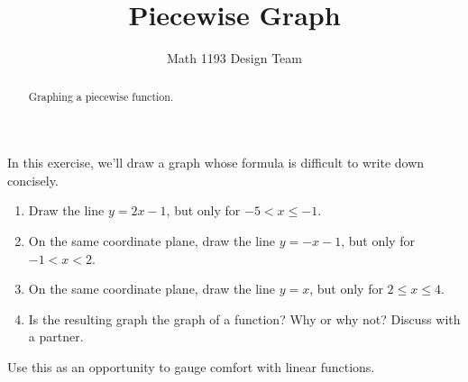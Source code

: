 \documentclass[noauthor]{ximera}
\title{Piecewise Graph}
\author{Math 1193 Design Team}
\begin{document}
\begin{abstract}
    Graphing a piecewise function.
\end{abstract}
\maketitle

In this exercise, we'll draw a graph whose formula is 
difficult to write down concisely.

\begin{enumerate}
    \item Draw the line \(y = 2x - 1\), but only for
    \(-5 < x \le -1\).
    \item On the same coordinate plane, draw the line 
    \(y = -x - 1\), but only for \(-1 < x < 2\).
    \item On the same coordinate plane, draw the line \(y = x\),
    but only for \(2 \le x \le 4\).
    \item Is the resulting graph the graph of a function? Why or
    why not? Discuss with a partner.
\end{enumerate}

\begin{instructorNotes}
Use this as an opportunity to gauge comfort with linear functions.
\end{instructorNotes}
\end{document}
